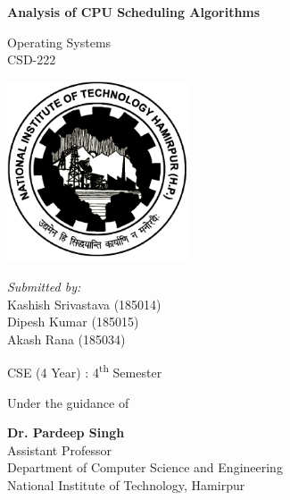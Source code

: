 \documentclass[11pt,a4paper]{report}
\begin{document}
\begin{titlepage}
    \begin{center}

        \Huge{\textbf{Analysis of CPU Scheduling Algorithms}}
 
        \vspace{5pt}
        
        \normalsize
       
        \vspace{5pt}
        
        Operating Systems\\
        CSD-222

    
        \vspace{10pt}
        \includegraphics[width=0.4\textwidth]{./img/logo.png}
        
        \vspace{15pt}
        \textit{Submitted by:}\\
            Kashish Srivastava (185014)\\
            Dipesh Kumar (185015)\\
            Akash Rana (185034)
        \vspace{5pt}
 
        CSE (4 Year) : 
        4\textsuperscript{th} Semester
 
        \vspace{1cm}
 
        Under the guidance of
        
        \vspace{5pt}
        
        \textbf{Dr. Pardeep Singh }\\
		\large
		Assistant Professor\\ Department of Computer Science and Engineering\\
		National Institute of Technology, Hamirpur\\
		
      
    \end{center}
\end{titlepage}
\end{document}
